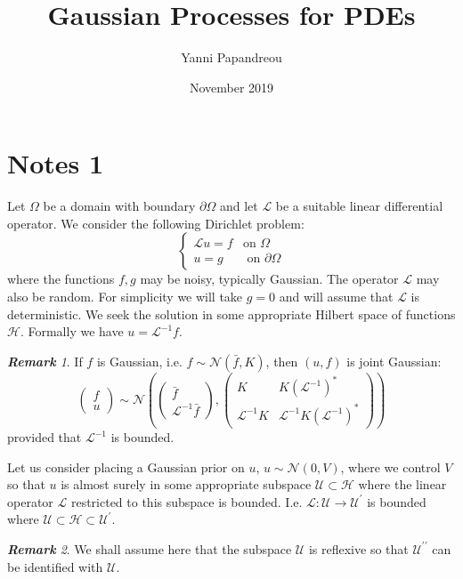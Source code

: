 \documentclass{article}
\title{Gaussian Processes for PDEs}
\author{Yanni Papandreou}
\date{November 2019}
\theoremstyle{definition}
\theoremstyle{remark}
\newtheorem*{remark}{\textbf{Remark}}  %
\begin{document}
\maketitle

\section{Notes 1}

Let $\Omega$ be a domain with boundary $\partial\Omega$ and let $\mathcal{L}$ be a suitable linear differential operator. We consider the following Dirichlet problem:
\begin{equation}
\label{DirichletProb}
    \left\{
    \begin{array}{cc}
        \mathcal{L}u=f & \text{on } \Omega  \\
         u = g  & \text{ on } \partial\Omega
    \end{array}
    \right.
\end{equation}
where the functions $f,g$ may be noisy, typically Gaussian. The operator $\mathcal{L}$ may also be random. For simplicity we will take $g=0$ and will assume that $\mathcal{L}$ is deterministic. We seek the solution in some appropriate Hilbert space of functions $\mathcal{H}$. Formally we have $u=\mathcal{L}^{-1}f$.

\begin{remark}
If $f$ is Gaussian, i.e. $f\sim\mathcal{N}(\bar{f},K)$, then $(u,f)$ is joint Gaussian:
\begin{equation}
\label{trueJoint}
    \begin{pmatrix}
        f \\
        u
    \end{pmatrix} \sim \mathcal{N}\left(
    \begin{pmatrix}
    \bar{f} \\
    \mathcal{L}^{-1}\bar{f}
    \end{pmatrix},
    \begin{pmatrix}
    K & K(\mathcal{L}^{-1})^{*} \\
    \mathcal{L}^{-1}K & \mathcal{L}^{-1}K(\mathcal{L}^{-1})^{*}
    \end{pmatrix}
    \right)
\end{equation}
provided that $\mathcal{L}^{-1}$ is bounded.
\end{remark}

Let us consider placing a Gaussian prior on $u$, $u\sim\mathcal{N}(0,V)$, where we control $V$ so that $u$ is almost surely in some appropriate subspace $\mathcal{U}\subset\mathcal{H}$ where the linear operator $\mathcal{L}$ restricted to this subspace is bounded. I.e. $\mathcal{L}:\mathcal{U}\rightarrow \mathcal{U}^{\prime}$ is bounded where $\mathcal{U}\subset\mathcal{H}\subset\mathcal{U}^{\prime}$.
\begin{remark}
    We shall assume here that the subspace $\mathcal{U}$ is reflexive so that $\mathcal{U}^{\prime\prime}$ can be identified with $\mathcal{U}$.
\end{remark}
\end{document}

